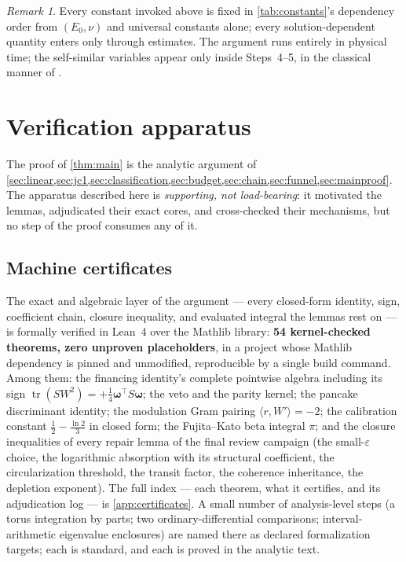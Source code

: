 \documentclass[11pt,letterpaper]{amsart}
\theoremstyle{definition}
\theoremstyle{remark}
\newtheorem{remark}[theorem]{Remark}
\newcommand{\vort}{\boldsymbol{\omega}}
\begin{document}
\begin{remark}
Every constant invoked above is fixed in \cref{tab:constants}'s dependency order from
$(E_0,\nu)$ and universal constants alone; every solution-dependent quantity enters
only through estimates. The argument runs entirely in physical time; the self-similar
variables appear only inside Steps~4--5, in the classical manner of
\cite{CKN1982,NRS1996,Tsai1998}.
\end{remark}

\section{Verification apparatus}\label{sec:verification}

The proof of \cref{thm:main} is the analytic argument of
\cref{sec:linear,sec:jc1,sec:classification,sec:budget,sec:chain,sec:funnel,sec:mainproof}.
The apparatus described here is \emph{supporting, not load-bearing}: it motivated the
lemmas, adjudicated their exact cores, and cross-checked their mechanisms, but no step
of the proof consumes any of it.

\subsection{Machine certificates}\label{subsec:lean}
The exact and algebraic layer of the argument --- every closed-form identity, sign,
coefficient chain, closure inequality, and evaluated integral the lemmas rest on ---
is formally verified in Lean~4 over the Mathlib library: \textbf{54 kernel-checked
theorems, zero unproven placeholders}, in a project whose Mathlib dependency is
pinned and unmodified, reproducible by a single build command. Among them: the
financing identity's complete pointwise algebra including its sign
$\operatorname{tr}(SW^2)=+\tfrac14\vort^{\top}S\vort$; the veto and the parity kernel;
the pancake discriminant identity; the modulation Gram pairing
$\langle r,W'\rangle=-2$; the calibration constant $\tfrac12-\tfrac{\ln2}{3}$ in
closed form; the Fujita--Kato beta integral $\pi$; and the closure inequalities of
every repair lemma of the final review campaign (the small-$\varepsilon$ choice, the
logarithmic absorption with its structural coefficient, the circularization threshold,
the transit factor, the coherence inheritance, the depletion exponent). The full index
--- each theorem, what it certifies, and its adjudication log --- is
\cref{app:certificates}. A small number of analysis-level steps (a torus integration
by parts; two ordinary-differential comparisons; interval-arithmetic eigenvalue
enclosures) are named there as declared formalization targets; each is standard, and
each is proved in the analytic text.
\end{document}
